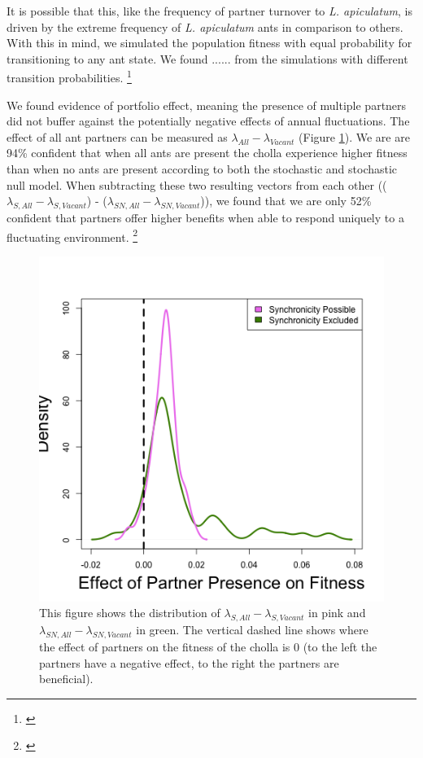 \documentclass[11pt]{article}
\newcommand{\ali}[2]{{\color{blue}{#1}}\footnote{\textit{\color{blue}{#2}}}}
\begin{document}
It is possible that this, like the frequency of partner turnover to \textit{L. apiculatum}, is driven by the extreme frequency of \textit{L. apiculatum} ants in comparison to others. 
With this in mind, we simulated the population fitness with equal probability for transitioning to any ant state.
We found ...... from the simulations with different transition probabilities.
 \ali{}{This feels like the most natural progression to me.}

We found evidence of portfolio effect, meaning the presence of multiple partners did not buffer against the potentially negative effects of annual fluctuations.
The effect of all ant partners can be measured as $\lambda_{All} - \lambda_{Vacant}$ (Figure \ref{fig:Portfolio}).
We are are 94\% confident that when all ants are present the cholla experience higher fitness than when no ants are present according to both the stochastic and stochastic null model. 
When subtracting these two resulting vectors from each other (($\lambda_{S,All} - \lambda_{S,Vacant}$) - ($\lambda_{SN,All} - \lambda_{SN,Vacant}$)), we found that we are only 52\% confident that partners offer higher benefits when able to respond uniquely to a fluctuating environment. 
\ali{There is no real difference between the two scenarios, meaning we have no evidence of portfolio effect.}{I am not sure if I have explained enough here honestly.}

\begin{figure}
	\includegraphics[width=\linewidth]{Figures/portfolio_effect.png}
	\caption{This figure shows the distribution of $\lambda_{S,All}-\lambda_{S,Vacant}$ in pink and $\lambda_{SN,All}-\lambda_{SN,Vacant}$ in green. The vertical dashed line shows where the effect of partners on the fitness of the cholla is 0 (to the left the partners have a negative effect, to the right the partners are beneficial).}
	\label{fig:Portfolio}
\end{figure}
\end{document}
